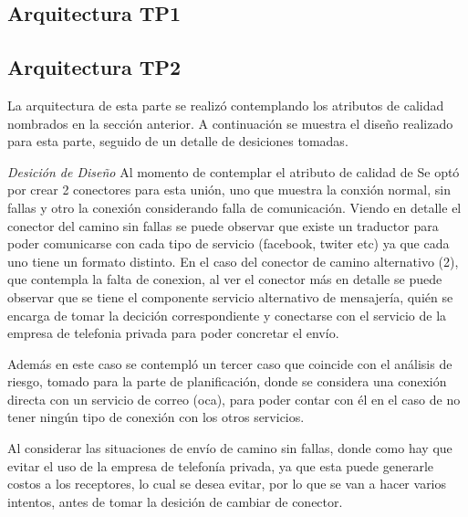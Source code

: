 \documentclass[a4paper, 11pt]{article}
\begin{document}
\subsection{Arquitectura TP1}
\subsection{Arquitectura TP2}
La arquitectura de esta parte se realizó contemplando los atributos de calidad nombrados en la sección anterior. A continuación se muestra el diseño realizado para esta parte, seguido de un detalle de desiciones tomadas.

\emph{Desición de Diseño} Al momento de contemplar el atributo de calidad de %
Se optó por crear 2 conectores para esta unión, uno que muestra la conxión normal, sin fallas y otro la conexión considerando falla de comunicación. 
Viendo en detalle el conector del camino sin fallas se puede observar que existe un traductor para poder comunicarse con cada tipo de servicio (facebook, twiter etc) ya que cada uno tiene un formato distinto.
En el caso del conector de camino alternativo (2), que contempla la falta de conexion, al ver el conector más en detalle se puede observar  que se tiene el componente servicio alternativo de mensajería, quién se encarga de tomar la decición correspondiente y conectarse con el servicio de la empresa de telefonia privada para poder concretar el envío.

Además en este caso se contempló un tercer caso que coincide con el análisis de riesgo, tomado para la parte de planificación, donde se considera una conexión directa con un servicio de correo (oca), para poder contar con él en el caso de no tener ningún tipo de conexión con los otros servicios. %

Al considerar las situaciones de envío de camino sin fallas, donde como hay que evitar el uso de la empresa de telefonía privada, ya que esta puede generarle costos a los receptores, lo cual se desea evitar, por lo que se van a hacer varios intentos, antes de tomar la desición de cambiar de conector.
\end{document}
